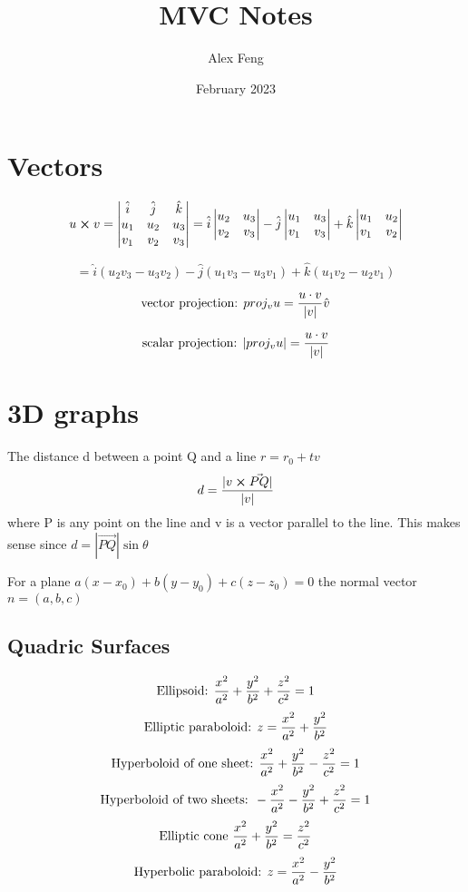 \documentclass{article}
\title{MVC Notes}
\author{Alex Feng}
\date{February 2023}
\begin{document}
\setlength{\parindent}{0pt}    
\maketitle

\section{Vectors}
$$u \cross v = 
\begin{vmatrix}
    \hat{i} & \hat{j} & \hat{k} \\
    u_1 & u_2 & u_3 \\
    v_1 & v_2 & v_3
\end{vmatrix}
 = \hat{i}\begin{vmatrix} 
    u_2 & u_3 \\ v_2 & v_3
    
\end{vmatrix}
- \hat{j}\begin{vmatrix}
    u_1 & u_3 \\
    v_1 & v_3
\end{vmatrix}
+\hat{k}\begin{vmatrix}
    u_1 & u_2 \\
    v_1 & v_2
\end{vmatrix}$$

$$= \hat{i}(u_2 v_3 - u_3 v_2) - \hat{j}(u_1 v_3 - u_3 v_1) + \hat{k}(u_1 v_2 - u_2 v_1)$$

$$\textnormal{vector projection:  } proj_v u = \frac{u \cdot v}{|v|} \hat{v}$$ 

$$\textnormal{scalar projection:  } |proj_v u| = \frac{u \cdot v}{|v|}$$

\section{3D graphs}

The distance d between a point Q and a line $r=r_0 +tv$
$$d = \frac{|v \cross \Vec{PQ}|}{|v|} $$
where P is any point on the line and v is a vector parallel to the line. This makes sense since $d = |\Vec{PQ}| \sin \theta$

\vskip 30pt

\noindent For a plane $a(x-x_0 ) + b (y- y_0 ) + c(z- z_0) = 0$
the normal vector $n = (a,b,c)$
\pagebreak
\subsection{Quadric Surfaces}
$$\textnormal{Ellipsoid: }\frac{x^2}{a^2} + \frac{y^2}{b^2} + \frac{z^2}{c^2} = 1$$
$$\textnormal{Elliptic paraboloid: }z = \frac{x^2}{a^2} + \frac{y^2}{b^2}$$
$$\textnormal{Hyperboloid of one sheet: }\frac{x^2}{a^2}+\frac{y^2}{b^2}-\frac{z^2}{c^2}=1$$
$$\textnormal{Hyperboloid of two sheets: }-\frac{x^2}{a^2}-\frac{y^2}{b^2}+\frac{z^2}{c^2}=1$$
$$\textnormal{Elliptic cone }\frac{x^2}{a^2}+\frac{y^2}{b^2}=\frac{z^2}{c^2}$$
$$\textnormal{Hyperbolic paraboloid: }z=\frac{x^2}{a^2}-\frac{y^2}{b^2}$$
\end{document}

